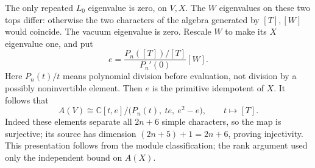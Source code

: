 \documentclass[11pt]{article}
\newcommand{\C}{\mathbb C}\newcommand{\Q}{\mathbb Q}\newcommand{\Z}{\mathbb Z}
\numberwithin{equation}{section}
\begin{document}
The only repeated $L_0$ eigenvalue is zero, on $V,X$. The $W$ eigenvalues on these two tops differ: otherwise the two characters of the algebra generated by $[T],[W]$ would coincide. The vacuum eigenvalue is zero. Rescale $W$ to make its $X$ eigenvalue one, and put
\[
 e=\frac{P_n([T])/[T]}{P_n'(0)}[W].
\]
Here $P_n(t)/t$ means polynomial division before evaluation, not division by a possibly noninvertible element. Then $e$ is the primitive idempotent of $X$. It follows that
\begin{equation}\label{B:ZhuPresentation}
 A(V)\cong\C[t,e]/\big(P_n(t),\ te,\ e^2-e\big),
 \qquad t\longmapsto[T].
\end{equation}
Indeed these elements separate all $2n+6$ simple characters, so the map is surjective; its source has dimension $(2n+5)+1=2n+6$, proving injectivity. This presentation follows from the module classification; the rank argument used only the independent bound on $A(X)$.
\end{document}
